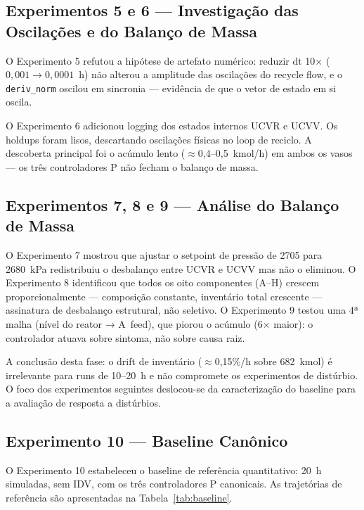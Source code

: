 \subsection{Experimentos 5 e 6 — Investigação das Oscilações e do Balanço de Massa}

O Experimento 5 refutou a hipótese de artefato numérico: reduzir dt 10× ($0{,}001 \to 0{,}0001$~h) não alterou a amplitude das oscilações do recycle flow, e o \texttt{deriv\_norm} oscilou em sincronia — evidência de que o vetor de estado em si oscila.

O Experimento 6 adicionou logging dos estados internos UCVR e UCVV. Os holdups foram lisos, descartando oscilações físicas no loop de reciclo. A descoberta principal foi o acúmulo lento ($\approx$0,4–0,5~kmol/h) em ambos os vasos — os três controladores P não fecham o balanço de massa.

\subsection{Experimentos 7, 8 e 9 — Análise do Balanço de Massa}

O Experimento 7 mostrou que ajustar o setpoint de pressão de 2705 para 2680~kPa redistribuiu o desbalanço entre UCVR e UCVV mas não o eliminou. O Experimento 8 identificou que todos os oito componentes (A–H) crescem proporcionalmente — composição constante, inventário total crescente — assinatura de desbalanço estrutural, não seletivo. O Experimento 9 testou uma 4ª malha (nível do reator → A~feed), que piorou o acúmulo (6× maior): o controlador atuava sobre sintoma, não sobre causa raiz.

A conclusão desta fase: o drift de inventário ($\approx$0,15\%/h sobre 682~kmol) é irrelevante para runs de 10–20~h e não compromete os experimentos de distúrbio. O foco dos experimentos seguintes deslocou-se da caracterização do baseline para a avaliação de resposta a distúrbios.

\subsection{Experimento 10 — Baseline Canônico}

O Experimento 10 estabeleceu o baseline de referência quantitativo: 20~h simuladas, sem IDV, com os três controladores P canonicais. As trajetórias de referência são apresentadas na Tabela~\ref{tab:baseline}.

